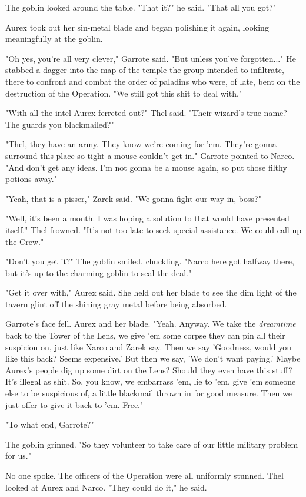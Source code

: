 \documentclass[10pt,a4paper,twoside,bg=print,twocolumn,openany,nodeprecatedcode]{dndbook}
\begin{document}
The goblin looked around the table. "That it?" he said. "That all you got?"

Aurex took out her sin-metal blade and began polishing it again, looking meaningfully at the goblin.

"Oh yes, you're all very clever," Garrote said. "But unless you've forgotten..." He stabbed a dagger into the map of the temple the group intended to infiltrate, there to confront and combat the order of paladins who were, of late, bent on the destruction of the Operation. "We still got this shit to deal with."

"With all the intel Aurex ferreted out?" Thel said. "Their wizard's true name? The guards you blackmailed?"

"Thel, they have an army. They know we're coming for 'em. They're gonna surround this place so tight a mouse couldn't get in." Garrote pointed to Narco. "And don't get any ideas. I'm not gonna be a mouse again, so put those filthy potions away."

"Yeah, that is a pisser," Zarek said. "We gonna fight our way in, boss?"

"Well, it's been a month. I was hoping a solution to that would have presented itself." Thel frowned. "It's not too late to seek special assistance. We could call up the Crew."

"Don't you get it?" The goblin smiled, chuckling. "Narco here got halfway there, but it's up to the charming goblin to seal the deal."

"Get it over with," Aurex said. She held out her blade to see the dim light of the tavern glint off the shining gray metal before being absorbed.

Garrote's face fell. Aurex and her blade. "Yeah. Anyway. We take the \textit{dreamtime} back to the Tower of the Lens, we give 'em some corpse they can pin all their suspicion on, just like Narco and Zarek say. Then we say 'Goodness, would you like this back? Seems expensive.' But then we say, 'We don't want paying.' Maybe Aurex's people dig up some dirt on the Lens? Should they even have this stuff? It's illegal as shit. So, you know, we embarrass 'em, lie to 'em, give 'em someone else to be suspicious of, a little blackmail thrown in for good measure. Then we just offer to give it back to 'em. Free."

"To what end, Garrote?"

The goblin grinned. "So they volunteer to take care of our little military problem for us."

No one spoke. The officers of the Operation were all uniformly stunned. Thel looked at Aurex and Narco. "They could do it," he said.
\end{document}
